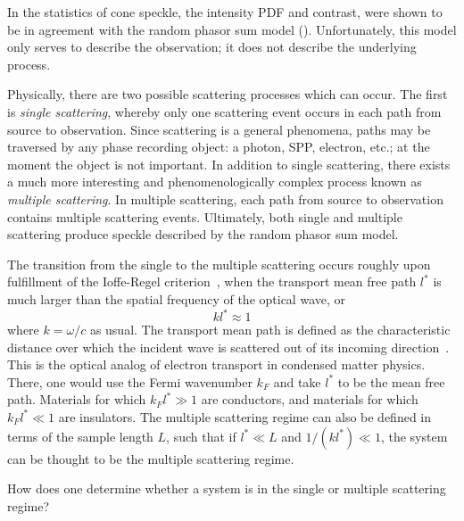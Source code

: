 In  the statistics of cone speckle, the intensity PDF and
contrast, were shown to be in agreement with the random phasor sum model
().  Unfortunately, this model only serves to describe
the observation; it does not describe the underlying process.

Physically, there are two possible scattering processes which can occur.  The
first is \textit{single scattering}, whereby only one scattering event occurs
in each path from source to observation.  Since scattering is a general
phenomena, paths may be traversed by any phase recording object: a photon,
SPP, electron, etc.; at the moment the object is not important.  In addition
to single scattering, there exists a much more interesting and
phenomenologically complex process known as \textit{multiple scattering}.  In
multiple scattering, each path from source to observation contains multiple
scattering events.  Ultimately, both single and multiple scattering produce
speckle described by the random phasor sum model.


The transition from the single to the multiple scattering occurs roughly upon
fulfillment of the Ioffe-Regel criterion~\cite{ioffe1960non}, when the
transport mean free path $l^*$ is much larger than the spatial frequency of
the optical wave, or
\begin{equation}
k l^* \approx 1
\end{equation}
where $k=\omega/c$ as usual.  The transport mean path is defined as the
characteristic distance over which the incident wave is scattered out of
its incoming direction~\cite{berkovits1994correlations}.  This is the
optical analog of electron transport in condensed matter physics.  There,
one would use the Fermi wavenumber $k_F$ and take $l^*$ to be the mean free
path.  Materials for which $k_F l^* \gg 1$ are conductors, and materials
for which $k_F l^* \ll 1$ are insulators.  The multiple scattering regime can
also be defined in terms of the sample length $L$, such that if
$l^* \ll L$ and $1/(k l^*) \ll 1$, the system can be thought to be the
multiple scattering regime.  

How does one determine whether a system is in the single or multiple
scattering regime?
